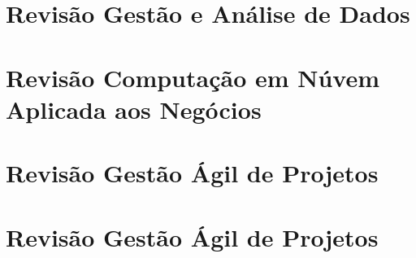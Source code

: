 \documentclass[
]{book}
\begin{document}
\chapter{Revisão Gestão e Análise de Dados}\label{revisuxe3o-gestuxe3o-e-anuxe1lise-de-dados}

\chapter{Revisão Computação em Núvem Aplicada aos Negócios}\label{revisuxe3o-computauxe7uxe3o-em-nuxfavem-aplicada-aos-neguxf3cios}

\chapter{Revisão Gestão Ágil de Projetos}\label{revisuxe3o-gestuxe3o-uxe1gil-de-projetos}

\chapter{Revisão Gestão Ágil de Projetos}\label{revisuxe3o-gestuxe3o-uxe1gil-de-projetos-1}


\end{document}
